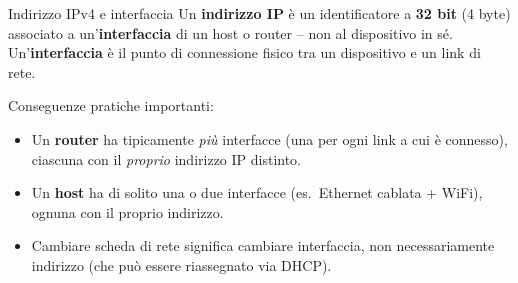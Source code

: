 \documentclass[a4paper,12pt]{report}
\begin{document}
\begin{defbox}{Indirizzo IPv4 e interfaccia}
Un \textbf{indirizzo IP} è un identificatore a \textbf{32 bit} (4 byte) associato
a un'\textbf{interfaccia} di un host o router -- non al dispositivo in sé.
Un'\textbf{interfaccia} è il punto di connessione fisico tra un dispositivo
e un link di rete.

Conseguenze pratiche importanti:
\begin{itemize}
    \item Un \textbf{router} ha tipicamente \emph{più} interfacce (una per
          ogni link a cui è connesso), ciascuna con il \emph{proprio}
          indirizzo IP distinto.
    \item Un \textbf{host} ha di solito una o due interfacce
          (es.\ Ethernet cablata + WiFi), ognuna con il proprio indirizzo.
    \item Cambiare scheda di rete significa cambiare interfaccia, non
          necessariamente indirizzo (che può essere riassegnato via DHCP).
\end{itemize}
\end{defbox}
\end{document}
